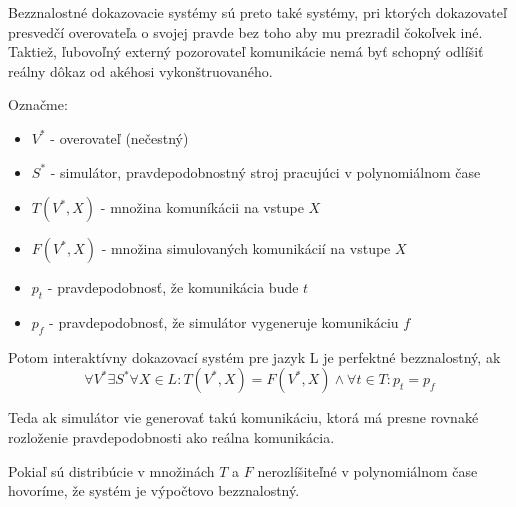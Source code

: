 Bezznalostné dokazovacie systémy sú preto také systémy, pri ktorých
dokazovateľ presvedčí overovateľa o svojej pravde bez toho aby mu
prezradil čokoľvek iné. Taktiež, ľubovoľný externý pozorovateľ
komunikácie nemá byť schopný odlíšiť reálny dôkaz od akéhosi
vykonštruovaného. 

\begin{definicia}

Označme:
\begin{itemize}
\itemsep -1.2mm
\item $V^*$ - overovateľ (nečestný)
\item $S^*$ - simulátor, pravdepodobnostný stroj pracujúci v polynomiálnom čase
\item $T(V^*, X)$ - množina komuníkácii na vstupe $X$
\item $F(V^*, X)$ - množina simulovaných komunikácií na vstupe $X$
\item $p_t$ - pravdepodobnosť, že komunikácia bude $t$
\item $p_f$ - pravdepodobnosť, že simulátor vygeneruje komunikáciu $f$
\end{itemize}

Potom interaktívny dokazovací systém pre jazyk L je perfektné bezznalostný,
ak 
$$\forall V^* \exists S^* \forall X \in L: T(V^*, X) = F(V^*, X) \land \forall t \in T\colon p_t = p_f$$

Teda ak simulátor vie generovať takú komunikáciu, ktorá má presne rovnaké rozloženie
pravdepodobnosti ako reálna komunikácia.
\end{definicia}

\begin{poznamka}
Pokiaľ sú distribúcie v množinách $T$ a $F$ nerozlíšiteľné
v polynomiálnom čase hovoríme, že systém je výpočtovo bezznalostný.
\end{poznamka}


